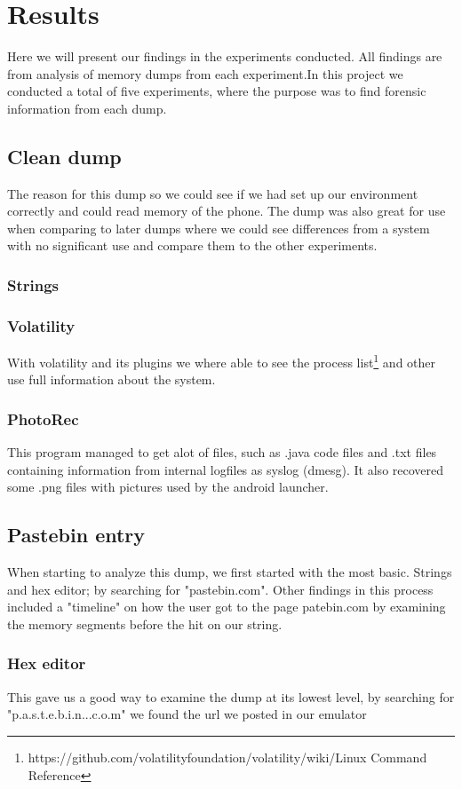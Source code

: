 \section{Results}
Here we will present our findings in the experiments conducted. All findings are from analysis of memory dumps from each experiment.In this project we conducted a total of five experiments, where the purpose was to find forensic information from each dump.
\subsection{Clean dump}
The reason for this dump so we could see if we had set up our environment correctly and could read memory of the phone. The dump was also great for use when comparing to later dumps where we could see differences from a system with no significant use and compare them to the other experiments.
\subsubsection{Strings}
\subsubsection{Volatility}
With volatility and its plugins we where able to see the process list\footnote{https://github.com/volatilityfoundation/volatility/wiki/Linux Command Reference} and other use full information about the system.
\subsubsection{PhotoRec}
This program managed to get alot of files, such as .java code files and .txt files containing information from internal logfiles as syslog (dmesg). It also recovered some .png files with pictures used by the android launcher.
\subsection{Pastebin entry}
When starting to analyze this dump, we first started with the most basic. Strings and hex editor; by searching for "pastebin.com". Other findings in this process included a "timeline" on how the user got to the page patebin.com by examining the memory segments before the hit on our string.
\subsubsection{Hex editor}
This gave us a good way to examine the dump at its lowest level, by searching for "p.a.s.t.e.b.i.n...c.o.m" we found the url we posted in our emulator
